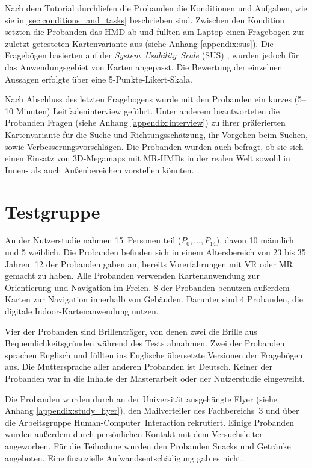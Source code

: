 Nach dem Tutorial durchliefen die Probanden die Konditionen und Aufgaben, wie sie in \autoref{sec:conditions_and_tasks} beschrieben sind.
Zwischen den Kondition setzten die Probanden das HMD ab und füllten am Laptop einen Fragebogen zur zuletzt getesteten Kartenvariante aus (siehe Anhang \autoref{appendix:sus}).
Die Fragebögen basierten auf der \emph{System~Usability~Scale} (SUS) \autocite{Brooke2013}, wurden jedoch für das Anwendungsgebiet von Karten angepasst.
Die Bewertung der einzelnen Aussagen erfolgte über eine 5-Punkte-Likert-Skala.

Nach Abschluss des letzten Fragebogens wurde mit den Probanden ein kurzes (5--10 Minuten) Leitfadeninterview geführt.
Unter anderem beantworteten die Probanden Fragen (siehe Anhang \autoref{appendix:interview}) zu ihrer präferierten Kartenvariante für die Suche und Richtungsschätzung, ihr Vorgehen beim Suchen, sowie Verbesserungsvorschlägen.
Die Probanden wurden auch befragt, ob sie sich einen Einsatz von 3D-Megamaps mit MR-HMDs in der realen Welt sowohl in Innen- als auch Außenbereichen vorstellen könnten.

\section{Testgruppe}
An der Nutzerstudie nahmen 15~Personen teil ($P_0, \dots, P_{14}$), davon 10 männlich und 5 weiblich.
Die Probanden befinden sich in einem Altersbereich von 23 bis 35 Jahren.
12 der Probanden gaben an, bereits Vorerfahrungen mit VR oder MR gemacht zu haben.
Alle Probanden verwenden Kartenanwendung zur Orientierung und Navigation im Freien.
8 der Probanden benutzen außerdem Karten zur Navigation innerhalb von Gebäuden.
Darunter sind 4 Probanden, die digitale Indoor-Kartenanwendung nutzen.

Vier der Probanden sind Brillenträger, von denen zwei die Brille aus Bequemlichkeitsgründen während des Tests abnahmen.
Zwei der Probanden sprachen Englisch und füllten ins Englische übersetzte Versionen der Fragebögen aus.
Die Muttersprache aller anderen Probanden ist Deutsch.
Keiner der Probanden war in die Inhalte der Masterarbeit oder der Nutzerstudie eingeweiht.

Die Probanden wurden durch an der Universität ausgehängte Flyer (siehe Anhang \autoref{appendix:study_flyer}), den Mailverteiler des Fachbereichs~3 und über die Arbeitsgruppe Human-Computer~Interaction rekrutiert.
Einige Probanden wurden außerdem durch persönlichen Kontakt mit dem Versuchsleiter angeworben.
Für die Teilnahme wurden den Probanden Snacks und Getränke angeboten.
Eine finanzielle Aufwandsentschädigung gab es nicht.

